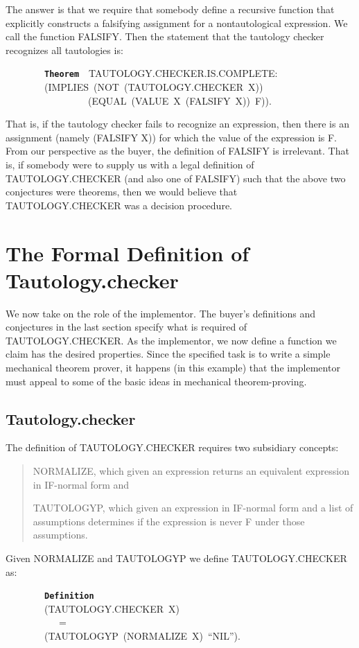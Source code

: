 \documentclass[11pt]{book}
\newenvironment{pubasis}{\begin{flushleft}\ttfamily\small}{\normalsize\rmfamily\end{flushleft}}
\newenvironment{pubcrown}{\begin{quote}}{\end{quote}}
\newcommand{\axiomordefinition}[1]{\vspace{6pt}\texttt{\textbf{#1}}}
\newcommand{\pubdefaulttextsize}{\large}
\begin{document}
The answer is that we  require that somebody define  a recursive
function that explicitly constructs a falsifying assignment for a nontautological expression.
We  call the function FALSIFY.  Then the statement that the tautology checker
recognizes all tautologies is:
\begin{pubasis}
~~~~~~~~\axiomordefinition{Theorem}~~TAU\-TOL\-OGY.CHECK\-ER.IS.COMPLETE:\\
~~~~~~~~(IMPLIES~(NOT~(TAU\-TOL\-OGY.CHECK\-ER~X))\\
~~~~~~~~~~~~~~~~~(EQUAL~(VALUE~X~(FALSIFY~X))~F)).\\
\end{pubasis}
That is, if the tautology checker fails to recognize an expression, then
there is an assignment (namely  (FALSIFY X)) 
for which the value of the expression is F.
From our perspective as the buyer,
the definition of FALSIFY is irrelevant.  That is, if somebody were to supply us with a legal definition of
TAU\-TOL\-OGY.CHECK\-ER (and also one of FAL\-SI\-FY) such that the above
two conjectures were theorems, then we would believe that TAU\-TOL\-OGY.CHECK\-ER
was a decision procedure.
\section{The Formal Definition of Tautology.checker}
\pubdefaulttextsize
We now take on the role of the implementor.
The buyer's definitions and conjectures in the last section specify what
is required of TAU\-TOL\-OGY.CHECK\-ER.  As the implementor, we now define a function we claim
has the desired properties.  Since the specified task is to write a simple
mechanical theorem prover, it happens (in this example) that the
implementor must appeal to some of the basic ideas in mechanical
theorem-proving.
\subsection{Tautology.checker}
\pubdefaulttextsize
The definition of TAU\-TOL\-OGY.CHECK\-ER requires two subsidiary concepts:
\begin{pubcrown}
NORMALIZE, which given an expression returns an equivalent expression
in IF-normal form and

TAUTOLOGYP, which given an expression in IF-normal form
and a list of assumptions determines if the expression is
never F under those assumptions.
\end{pubcrown}

Given NORMALIZE and TAUTOLOGYP we  define
TAU\-TOL\-OGY.CHECK\-ER as:
\begin{pubasis}
~~~~~~~~\axiomordefinition{Definition}\\
~~~~~~~~(TAU\-TOL\-OGY.CHECK\-ER~X)\\
~~~~~~~~~~~=\\
~~~~~~~~(TAUTOLOGYP~(NORMALIZE~X)~``NIL'').\\
\end{pubasis}
\end{document}
